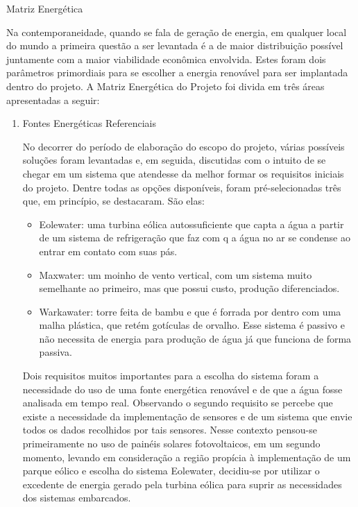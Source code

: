 \documentclass[12pt,openright,oneside,a4paper,brazil]{abntex2}
\begin{document}
\textual
\begin{center}
 {\large Matriz Energética}\\[0.2cm]
 \end{center}
 
Na contemporaneidade, quando se fala de geração de energia, em qualquer local do mundo a primeira questão a ser levantada é a de maior distribuição possível juntamente com a maior viabilidade econômica envolvida. Estes foram dois parâmetros primordiais para se escolher a energia renovável para ser implantada dentro do projeto. 
	A Matriz Energética do Projeto foi divida em três áreas apresentadas a seguir:
\begin{enumerate}
\item Fontes Energéticas Referenciais 


No decorrer do período de elaboração do escopo do projeto, várias possíveis soluções foram levantadas e, em seguida, discutidas com o intuito de se chegar em um sistema que atendesse da melhor formar os requisitos iniciais do projeto. Dentre todas as opções disponíveis, foram pré-selecionadas três que, em princípio, se destacaram. São elas:
\begin{itemize}
\item Eolewater: uma turbina eólica autossuficiente que capta a água a partir de um sistema de refrigeração que faz com q a água no ar se condense ao entrar em contato com suas pás.
\item Maxwater: um moinho de vento vertical, com um sistema muito semelhante ao primeiro, mas que possui custo, produção diferenciados.
\item Warkawater: torre feita de bambu e que é forrada por dentro com uma malha plástica, que retém gotículas de orvalho. Esse sistema é passivo e não necessita de energia para produção de água já que funciona de forma passiva.

\end{itemize}


Dois requisitos muitos importantes para a escolha do sistema foram a necessidade do uso de uma fonte energética renovável e de que a água fosse analisada em tempo real. Observando o segundo requisito se percebe que existe a necessidade da implementação de sensores e de um sistema que envie todos os dados recolhidos por tais sensores. Nesse contexto pensou-se primeiramente no uso de painéis solares fotovoltaicos, em um segundo momento, levando em consideração a região propícia à implementação de um parque eólico e escolha do sistema Eolewater, decidiu-se por utilizar o excedente de energia gerado pela turbina eólica para suprir as necessidades dos sistemas embarcados.



\end{enumerate}
\end{document}
